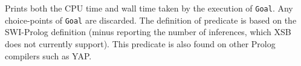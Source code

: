 \begin{description}
{%

}

%
Prints both the CPU time and wall time taken by the execution of \texttt{Goal}.
Any choice-points of \texttt{Goal} are discarded. The definition of predicate is based 
on the SWI-Prolog definition (minus reporting the number of inferences, which XSB does 
not currently support). This predicate is also found on other Prolog compilers such as YAP.

\end{description}





